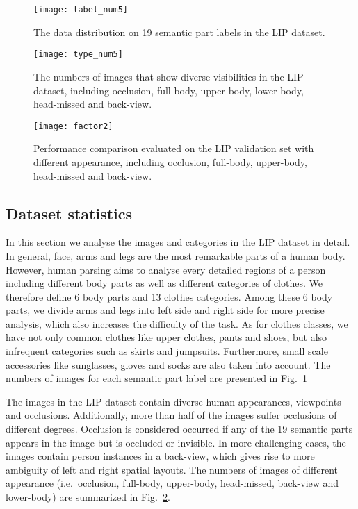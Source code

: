 \documentclass[10pt,twocolumn,letterpaper]{article}
\begin{document}
\begin{figure}[]
\centering
   \texttt{[image: label\_num5]}
\vspace{-4mm}
\caption{The data distribution on 19 semantic part labels in the LIP dataset.}
\vspace{-4mm}
\label{fig: dataset_analysis_label}
\end{figure}
\begin{figure}[]
\centering
   \texttt{[image: type\_num5]}
\vspace{-3mm}
\caption{The numbers of images that show diverse visibilities in the LIP dataset, including occlusion, full-body, upper-body, lower-body, head-missed and back-view.}
\vspace{-6mm}
\label{fig: dataset_analysis_factor}
\end{figure}
\begin{figure}[]
\centering
   \texttt{[image: factor2]}
\vspace{-4mm}
\caption{Performance comparison evaluated on the LIP validation set with different appearance, including occlusion, full-body, upper-body, head-missed and back-view.}
\vspace{-6mm}
\label{fig: analysis_val}
\end{figure}

\subsection{Dataset statistics}
In this section we analyse the images and categories in the LIP dataset in detail. In general, face, arms and legs are the most remarkable parts of a human body. However, human parsing aims to analyse every detailed regions of a person including different body parts as well as different categories of clothes. We therefore define 6 body parts and 13 clothes categories. Among these 6 body parts, we divide arms and legs into left side and right side for more precise analysis, which also increases the difficulty of the task. As for clothes classes, we have not only common clothes like upper clothes, pants and shoes, but also infrequent categories such as skirts and jumpsuits. Furthermore, small scale accessories like sunglasses, gloves and socks are also taken into account. The numbers of images for each semantic part label are presented in Fig.~\ref{fig: dataset_analysis_label}

The images in the LIP dataset contain diverse human appearances, viewpoints and occlusions. Additionally, more than half of the images suffer occlusions of different degrees. Occlusion is considered occurred if any of the 19 semantic parts appears in the image but is occluded or invisible. In more challenging cases, the images contain person instances in a back-view, which gives rise to more ambiguity of left and right spatial layouts. The numbers of images of different appearance (i.e.\ occlusion, full-body, upper-body, head-missed, back-view and lower-body) are summarized in Fig.~\ref{fig: dataset_analysis_factor}.
\end{document}
